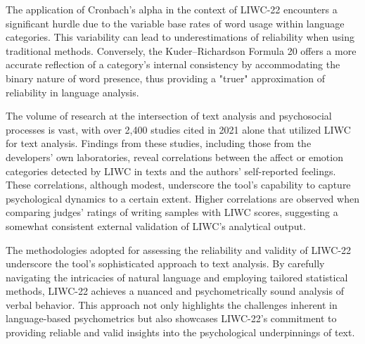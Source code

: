 The application of Cronbach’s alpha in the context of LIWC-22 encounters a significant hurdle due to the variable base rates of word usage within language categories. This variability can lead to underestimations of reliability when using traditional methods. Conversely, the Kuder–Richardson Formula 20 offers a more accurate reflection of a category's internal consistency by accommodating the binary nature of word presence, thus providing a "truer" approximation of reliability in language analysis.

The volume of research at the intersection of text analysis and psychosocial processes is vast, with over 2,400 studies cited in 2021 alone that utilized LIWC for text analysis. Findings from these studies, including those from the developers' own laboratories, reveal correlations between the affect or emotion categories detected by LIWC in texts and the authors' self-reported feelings. These correlations, although modest, underscore the tool's capability to capture psychological dynamics to a certain extent. Higher correlations are observed when comparing judges' ratings of writing samples with LIWC scores, suggesting a somewhat consistent external validation of LIWC's analytical output\cite{boyd2022development}.

The methodologies adopted for assessing the reliability and validity of LIWC-22 underscore the tool's sophisticated approach to text analysis. By carefully navigating the intricacies of natural language and employing tailored statistical methods, LIWC-22 achieves a nuanced and psychometrically sound analysis of verbal behavior. This approach not only highlights the challenges inherent in language-based psychometrics but also showcases LIWC-22's commitment to providing reliable and valid insights into the psychological underpinnings of text.








